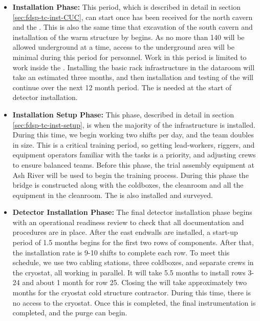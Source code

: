 \begin{itemize}
    \item {\bf {} Installation Phase:}
    This period, which is described in detail in section \ref{sec:fdsp-tc-inst-CUC}, can start once  has been received for the north cavern and the . This is also the same time that excavation of the south cavern and installation of the warm structure by  begins. As no more than 140  will be allowed underground at a time,  access to the underground area will be minimal during this period for  personnel.  Work in this period is limited to work inside the . Installing the basic rack infrastructure in the dataroom will take an estimated three months, and then installation and testing of the  will continue over the next 12 month period. The  is needed at the start of detector installation.  
    
    \item {\bf Installation Setup Phase:} This phase,  described in detail in section \ref{sec:fdsp-tc-inst-setup}, is when the majority of the infrastructure is installed. During this time, we begin working two shifts per day, and the  team doubles in size.  
    This is a critical training period, so getting lead-workers, riggers, and equipment operators familiar with the tasks is a priority, and adjusting crews to ensure balanced teams.  Before this phase, the  trial assembly equipment at Ash River will be used to begin the training process. During this phase the bridge is constructed along with the coldboxes, the cleanroom and all the equipment in the cleanroom. The  is also installed and surveyed.
    
    \item {\bf Detector Installation Phase:} The final detector installation phase begins with an operational readiness review to check that all documentation and procedures are in place. After the east endwalls are installed, a start-up period of 1.5 months begins for the first two rows of  components. After that, the installation rate is 9-10 shifts to complete each row.  To meet this schedule, we use two  cabling stations, three coldboxes, and separate crews in the cryostat, all working in parallel.  It will take 5.5 months to install rows 3-24 and about 1 month for row 25. Closing the  will take approximately two months for the cryostat cold structure contractor. During this time, there is no access to the cryostat.  Once this is completed, the final instrumentation is completed, and the purge can begin. 
    
\end{itemize}

